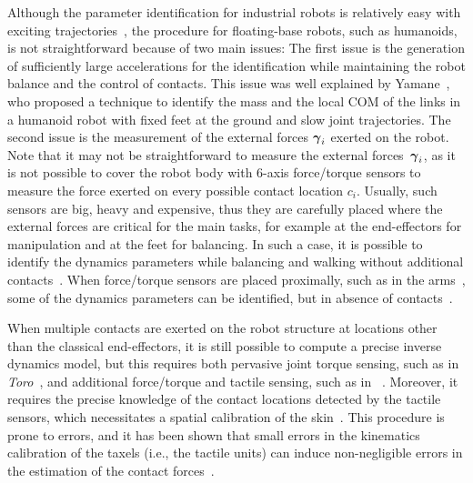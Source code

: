 
	Although the parameter identification for industrial robots is relatively easy with exciting trajectories~\cite{Pedrocchi2014}, the procedure for floating-base robots, such as humanoids, is not straightforward because of two main issues: 
      The first issue is the generation of sufficiently large accelerations for the identification while maintaining the robot balance and the control of contacts. 
      This issue was well explained by Yamane~\cite{yamane2011}, who proposed a technique to identify the mass and the local COM of the links in a humanoid robot with fixed feet at the ground and slow joint trajectories. 
      The second issue is the measurement of the external forces $\boldsymbol{\gamma}_i$ exerted on the robot.
      Note that it may not be straightforward to measure the external forces~$\boldsymbol{\gamma}_i$, as it is not possible to cover the robot body with 6-axis force/torque sensors to measure the force exerted on every possible contact location $c_i$. Usually, such sensors are big, heavy and expensive, thus they are carefully placed where the external forces are critical for the main tasks, for example at the end-effectors for manipulation and at the feet for balancing.
      In such a case, it is possible to identify the dynamics parameters while balancing and walking without additional contacts~\cite{Ogawa2014}.
      When force/torque sensors are placed proximally, such as in the \robot{} arms~\cite{Fumagalli2012}, some of the dynamics parameters can be identified, but in absence of contacts~\cite{Traversaro2013}.

      When multiple contacts are exerted on the robot structure at locations other than the classical end-effectors, it is still possible to compute a precise inverse dynamics model, but this requires both pervasive joint torque sensing, such as in \textit{Toro}~\cite{Ogawa2014}, and additional force/torque and tactile sensing, such as in \robot{}~\cite{Ivaldi2011}.
      Moreover, it requires the precise knowledge of the contact locations detected by the tactile sensors, which necessitates a spatial calibration of the skin~\cite{DelPrete2011}. 
      This procedure is prone to errors, and it has been shown that small errors in the kinematics calibration of the taxels (i.e., the tactile units) can induce non-negligible errors in the estimation of the contact forces~\cite{DelPrete2012}.

